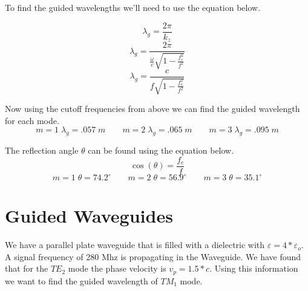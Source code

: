\documentclass{article}
\begin{document}
To find the guided wavelengths we'll need to use the equation below.

$$\lambda_{g} = \frac{2\pi}{k_{z}}$$
$$\lambda_{g} = \frac{2\pi}{\frac{\omega}{c}\sqrt{1-\frac{f_{c}^{2}}{f^{2}}}}$$
$$\lambda_{g} = \frac{c}{f\sqrt{1-\frac{f_{c}^{2}}{f^{2}}}}$$

Now using the cutoff frequencies from above we can find the guided wavelength for each mode.
$$\boxed{m=1\;\lambda_{g}=.057\;m \qquad m=2\;\lambda_{g}=.065\;m \qquad m=3\;\lambda_{g}=.095\;m}$$

The reflection angle $\theta$ can be found using the equation below.
$$\cos(\theta) = \frac{f_{c}}{f}$$
$$\boxed{m=1\;\theta=74.2^{\circ} \qquad m=2\;\theta=56.9^{\circ} \qquad m=3\;\theta = 35.1^{\circ}}$$

\section{Guided Waveguides}
We have a parallel plate waveguide that is filled with a dielectric with $\varepsilon=4*\varepsilon_{o}$. A signal frequency of 280 Mhz is propagating in the Waveguide. We have found that for the $TE_{2}$ mode the phase velocity is $v_{p} = 1.5*c$. Using this information we want to find the guided wavelength of $TM_{1}$ mode.
\end{document}
